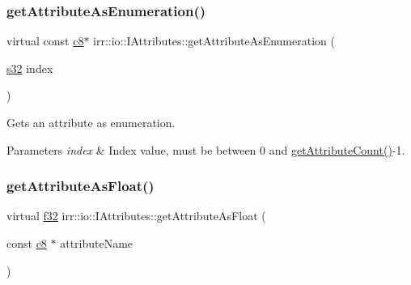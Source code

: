 \subsubsection{\texorpdfstring{get\+Attribute\+As\+Enumeration()}{getAttributeAsEnumeration()}\hspace{0.1cm}{\footnotesize\ttfamily [8/8]}}
{\footnotesize\ttfamily virtual const \hyperlink{namespaceirr_a9395eaea339bcb546b319e9c96bf7410}{c8}$\ast$ irr\+::io\+::\+I\+Attributes\+::get\+Attribute\+As\+Enumeration (\begin{DoxyParamCaption}\item[{\hyperlink{namespaceirr_ac66849b7a6ed16e30ebede579f9b47c6}{s32}}]{index }\end{DoxyParamCaption})\hspace{0.3cm}{\ttfamily [pure virtual]}}



Gets an attribute as enumeration. 


\begin{DoxyParams}{Parameters}
{\em index} & Index value, must be between 0 and \hyperlink{classirr_1_1io_1_1IAttributes_a796bdd9440ee7ba0b6742a90a82870b6}{get\+Attribute\+Count()}-\/1. \\
\hline
\end{DoxyParams}
\mbox{\label{classirr_1_1io_1_1IAttributes_a9bfcf5b9dae3fa18796c74888bef977f}} 
\subsubsection{\texorpdfstring{get\+Attribute\+As\+Float()}{getAttributeAsFloat()}\hspace{0.1cm}{\footnotesize\ttfamily [1/4]}}
{\footnotesize\ttfamily virtual \hyperlink{namespaceirr_a0277be98d67dc26ff93b1a6a1d086b07}{f32} irr\+::io\+::\+I\+Attributes\+::get\+Attribute\+As\+Float (\begin{DoxyParamCaption}\item[{const \hyperlink{namespaceirr_a9395eaea339bcb546b319e9c96bf7410}{c8} $\ast$}]{attribute\+Name }\end{DoxyParamCaption})\hspace{0.3cm}{\ttfamily [pure virtual]}}



